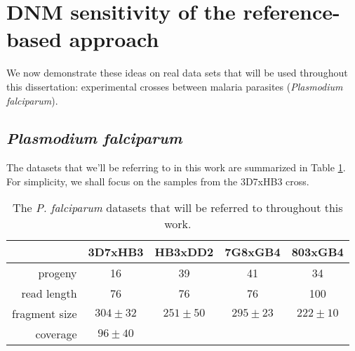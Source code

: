 \section{DNM sensitivity of the reference-based approach}

We now demonstrate these ideas on real data sets that will be used throughout this dissertation: experimental crosses between malaria parasites (\textit{Plasmodium falciparum}). %

\subsection{\textit{Plasmodium falciparum}}

The datasets that we'll be referring to in this work are summarized in Table \ref{tb:cross_info}.  For simplicity, we shall focus on the samples from the 3D7xHB3 cross.

\begin{table}[]
\centering
\caption{The \textit{P. falciparum} datasets that will be referred to throughout this work.}
\label{tb:cross_info}
\begin{tabular}{@{}rcccc@{}}
\toprule
                  & 3D7xHB3      & HB3xDD2      & 7G8xGB4      & 803xGB4      \\
\midrule
progeny           & 16           & 39           & 41           & 34           \\
read length       & 76           & 76           & 76           & 100          \\
fragment size     & $304 \pm 32$ & $251 \pm 50$ & $295 \pm 23$ & $222 \pm 10$ \\
coverage          & $96 \pm 40$  &              &              &              \\
\bottomrule
\end{tabular}
\end{table}

